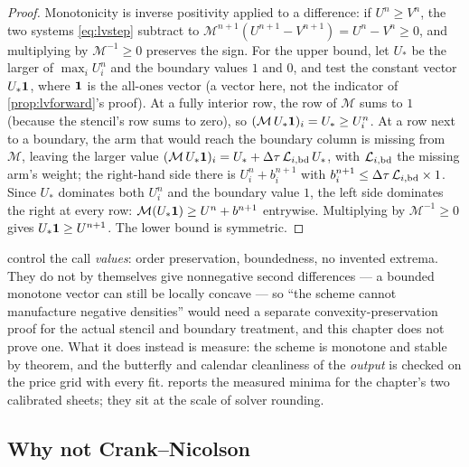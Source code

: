 \begin{proof}
Monotonicity is inverse positivity applied to a difference: if
$U^{n}\ge V^{n}$, the two systems \eqref{eq:lvstep} subtract to
$\mathcal M^{n+1}(U^{n+1}-V^{n+1})=U^{n}-V^{n}\ge0$, and multiplying
by $\mathcal M^{-1}\ge0$ preserves the sign.  For the upper bound, let
$U_\ast$ be the larger of $\max_iU^{n}_i$ and the boundary values $1$
and $0$, and test the constant vector $U_\ast\mathbf{1}$, where $\mathbf{1}$ is the
all-ones vector (a vector here, not the indicator of
\cref{prop:lvforward}'s proof).  At a fully interior row, the row of
$\mathcal M$ sums to $1$ (because the stencil's row sums to zero), so
$(\mathcal M\,U_\ast\mathbf{1})_i=U_\ast\ge U^{n}_i$.  At a row next to a
boundary, the arm that would reach the boundary column is missing from
$\mathcal M$, leaving the larger value
$(\mathcal M\,U_\ast\mathbf{1})_i=U_\ast+\Delta\tau\,\mathcal L_{i,\rm bd}\,U_\ast$,
with $\mathcal L_{i,\rm bd}$ the missing arm's weight; the right-hand
side there is $U^{n}_i+b^{n+1}_i$ with
$b^{n+1}_i\le\Delta\tau\,\mathcal L_{i,\rm bd}\times1$.  Since
$U_\ast$ dominates both $U^{n}_i$ and the boundary value $1$, the left
side dominates the right at every row:
$\mathcal M(U_\ast\mathbf{1})\ge U^{n}+b^{n+1}$ entrywise.  Multiplying by
$\mathcal M^{-1}\ge0$ gives $U_\ast\mathbf{1}\ge U^{n+1}$.  The lower bound is
symmetric.
\end{proof}

\begin{remark}
\label{rem:lvscope}
 control the call \emph{values}: order
preservation, boundedness, no invented extrema.  They do not by
themselves give nonnegative second differences --- a bounded monotone
vector can still be locally concave --- so ``the scheme cannot
manufacture negative densities'' would need a separate
convexity-preservation proof for the actual stencil and boundary
treatment, and this chapter does not prove one.  What it does instead
is measure: the scheme is monotone and stable by theorem, and the
butterfly and calendar cleanliness of the \emph{output} is checked on
the price grid with every fit.   reports the
measured minima for the chapter's two calibrated sheets; they sit at
the scale of solver rounding.
\end{remark}

\subsection{Why not Crank--Nicolson}

